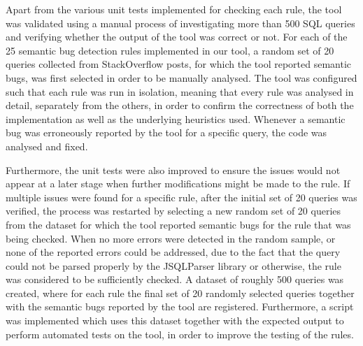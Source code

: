 Apart from the various unit tests implemented for checking each rule, the tool was validated using a manual process of investigating more than 500 SQL queries and verifying whether the output of the tool was correct or not. For each of the 25 semantic bug detection rules implemented in our tool, a random set of 20 queries collected from StackOverflow posts, for which the tool reported semantic bugs, was first selected in order to be manually analysed. The tool was configured such that each rule was run in isolation, meaning that every rule was analysed in detail, separately from the others, in order to confirm the correctness of both the implementation as well as the underlying heuristics used. Whenever a semantic bug was erroneously reported by the tool for a specific query, the code was analysed and fixed.

Furthermore, the unit tests were also improved to ensure the issues would not appear at a later stage when further modifications might be made to the rule. If multiple issues were found for a specific rule, after the initial set of 20 queries was verified, the process was restarted by selecting a new random set of 20 queries from the dataset for which the tool reported semantic bugs for the rule that was being checked. When no more errors were detected in the random sample, or none of the reported errors could be addressed, due to the fact that the query could not be parsed properly by the JSQLParser library or otherwise, the rule was considered to be sufficiently checked.
A dataset of roughly 500 queries was created, where for each rule the final set of 20 randomly selected queries together with the semantic bugs reported by the tool are registered. Furthermore, a script was implemented which uses this dataset together with the expected output to perform automated tests on the tool, in order to improve the testing of the rules.
